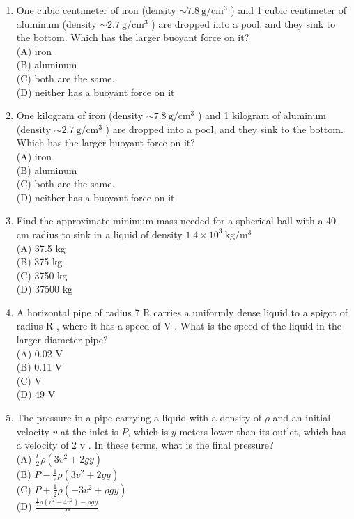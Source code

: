 \begin{enumerate}
\begin{enumerate}
  \item One cubic centimeter of iron (density $\sim 7.8 \mathrm{~g} / \mathrm{cm}^{3}$ ) and 1 cubic centimeter of aluminum (density $\sim 2.7 \mathrm{~g} / \mathrm{cm}^{3}$ ) are dropped into a pool, and they sink to the bottom. Which has the larger buoyant force on it?\\
(A) iron\\
(B) aluminum\\
(C) both are the same.\\
(D) neither has a buoyant force on it
  \item One kilogram of iron (density $\sim 7.8 \mathrm{~g} / \mathrm{cm}^{3}$ ) and 1 kilogram of aluminum (density $\sim 2.7 \mathrm{~g} / \mathrm{cm}^{3}$ ) are dropped into a pool, and they sink to the bottom. Which has the larger buoyant force on it?\\
(A) iron\\
(B) aluminum\\
(C) both are the same.\\
(D) neither has a buoyant force on it
  \item Find the approximate minimum mass needed for a spherical ball with a 40 cm radius to sink in a liquid of density $1.4 \times 10^{3} \mathrm{~kg} / \mathrm{m}^{3}$\\
(A) 37.5 kg\\
(B) 375 kg\\
(C) 3750 kg\\
(D) 37500 kg
  \item A horizontal pipe of radius 7 R carries a uniformly dense liquid to a spigot of radius R , where it has a speed of V . What is the speed of the liquid in the larger diameter pipe?\\
(A) 0.02 V\\
(B) 0.11 V\\
(C) V\\
(D) 49 V
  \item The pressure in a pipe carrying a liquid with a density of $\rho$ and an initial velocity $v$ at the inlet is $P$, which is $y$ meters lower than its outlet, which has a velocity of 2 v . In these terms, what is the final pressure?\\
(A) $\frac{P}{2} \rho\left(3 v^{2}+2 g y\right)$\\
(B) $P-\frac{1}{2} \rho\left(3 v^{2}+2 g y\right)$\\
(C) $P+\frac{1}{2} \rho\left(-3 v^{2}+\rho g y\right)$\\
(D) $\frac{\frac{1}{2} \rho\left(v^{2}-4 v^{2}\right)-\rho g y}{P}$

\end{enumerate}
\end{enumerate}
